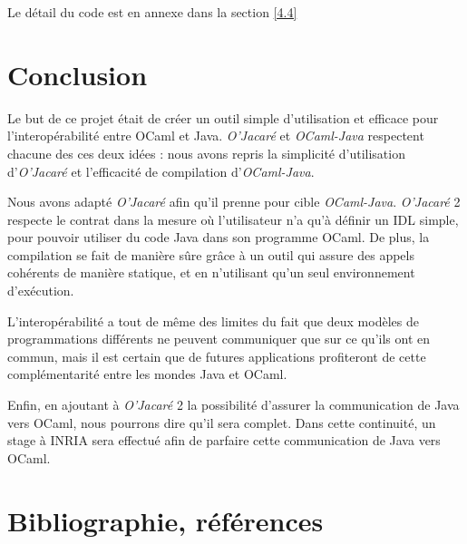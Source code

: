 \documentclass[a4paper, 11pt]{article}
\begin{document}
Le détail du code est en annexe dans la section \ref{4.4}


\newpage
\section*{Conclusion}


Le but de ce projet
était de créer un outil simple d'utilisation et efficace pour l'interopérabilité entre OCaml et Java.
\emph{O'Jacaré} et \emph{OCaml-Java} respectent chacune des ces deux
idées : nous avons repris la simplicité d'utilisation
d'\emph{O'Jacaré} et l'efficacité de compilation d'\emph{OCaml-Java}.

Nous avons adapté \emph{O'Jacaré} afin qu'il prenne pour cible
\emph{OCaml-Java}.  \emph{O'Jacaré} 2 respecte le contrat dans la
mesure où l'utilisateur n'a qu'à définir un IDL simple, pour pouvoir
utiliser du code Java dans son programme OCaml.  De plus, la
compilation se fait de manière sûre grâce à un outil qui assure des
appels cohérents de manière statique, et en n'utilisant qu'un seul environnement d'exécution.

L'interopérabilité a tout de même des limites du fait que deux modèles
de programmations différents ne peuvent communiquer que sur ce qu'ils
ont en commun, mais il est certain que de futures applications
profiteront de cette complémentarité entre les mondes Java et OCaml.

Enfin, en ajoutant à \emph{O'Jacaré} 2 la possibilité d'assurer la
communication de Java vers OCaml, nous pourrons dire qu'il
sera complet. Dans cette continuité, un stage à INRIA sera effectué afin de parfaire cette communication de Java vers OCaml.






























\newpage
\section*{Bibliographie, références}
\end{document}
